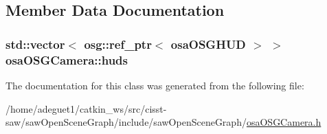 \subsection{Member Data Documentation}
\hypertarget{classosa_o_s_g_camera_a237022117dad9914d09ca392c455448b}{
\subsubsection[{huds}]{\setlength{\rightskip}{0pt plus 5cm}std\-::vector$<$ osg\-::ref\-\_\-ptr$<$ {\bf osa\-O\-S\-G\-H\-U\-D} $>$ $>$ osa\-O\-S\-G\-Camera\-::huds\hspace{0.3cm}{\ttfamily [protected]}}}\label{classosa_o_s_g_camera_a237022117dad9914d09ca392c455448b}


The documentation for this class was generated from the following file\-:\begin{DoxyCompactItemize}
\item 
/home/adeguet1/catkin\-\_\-ws/src/cisst-\/saw/saw\-Open\-Scene\-Graph/include/saw\-Open\-Scene\-Graph/\hyperlink{osa_o_s_g_camera_8h}{osa\-O\-S\-G\-Camera.\-h}\end{DoxyCompactItemize}
